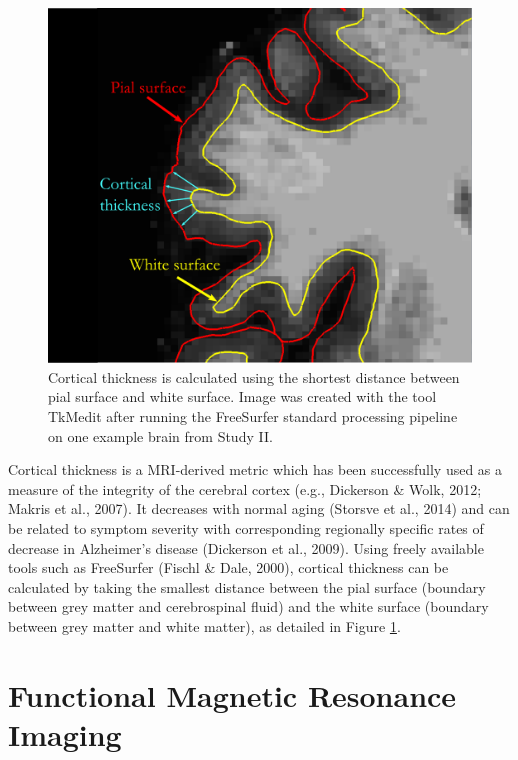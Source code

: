 \documentclass[12pt,openany]{book}
\theoremstyle{definition}
\theoremstyle{definition}
\theoremstyle{definition}
\theoremstyle{remark}
\begin{document}
\begin{figure}
\centering
\includegraphics{./figures/cortical_thickness_freesurfer.pdf}
\caption{Cortical thickness is calculated using the shortest distance between pial surface and white surface. Image was created with the tool TkMedit after running the FreeSurfer standard processing pipeline on one example brain from Study II.\label{fig_corticalthickness}}
\end{figure}

Cortical thickness is a MRI-derived metric which has been successfully
used as a measure of the integrity of the cerebral cortex (e.g.,
Dickerson \& Wolk, 2012; Makris et al., 2007). It decreases with normal
aging (Storsve et al., 2014) and can be related to symptom severity with
corresponding regionally specific rates of decrease in Alzheimer's
disease (Dickerson et al., 2009). Using freely available tools such as
FreeSurfer (Fischl \& Dale, 2000), cortical thickness can be calculated
by taking the smallest distance between the pial surface (boundary
between grey matter and cerebrospinal fluid) and the white surface
(boundary between grey matter and white matter), as detailed in Figure
\ref{fig_corticalthickness}.

\section{Functional Magnetic Resonance
Imaging}\label{functional-magnetic-resonance-imaging}
\end{document}
